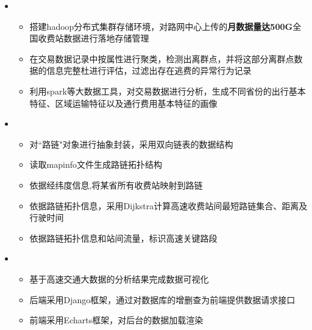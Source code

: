  \begin{itemize}[leftmargin=*]
    \item
      {\small
      \begin{itemize}
        \item 搭建hadoop分布式集群存储环境，对路网中心上传的\textbf{月数据量达500G}全国收费站数据进行落地存储管理
        \item 在交易数据记录中按属性进行聚类，检测出离群点，并将这部分离群点数据的信息完整杜进行评估，过滤出存在逃费的异常行为记录%
        \item 利用spark等大数据工具，对交易数据进行分析，生成不同省份的出行基本特征、区域运输特征以及通行费用基本特征的画像
      \end{itemize}
      }
	\item
	  {\small
      \begin{itemize}
      	\item 对“路链"对象进行抽象封装，采用双向链表的数据结构
        \item 读取mapinfo文件生成路链拓扑结构
        \item 依据经纬度信息,将某省所有收费站映射到路链
        \item 依据路链拓扑信息，采用Dijkstra计算高速收费站间最短路链集合、距离及行驶时间
        \item 依据路链拓扑信息和站间流量，标识高速关键路段
      \end{itemize}
      }
    \item
      {\small
      \begin{itemize}
      	\item 基于高速交通大数据的分析结果完成数据可视化
        \item 后端采用Django框架，通过对数据库的增删查为前端提供数据请求接口
        \item 前端采用Echarts框架，对后台的数据加载渲染
      \end{itemize}
      }
  \end{itemize}